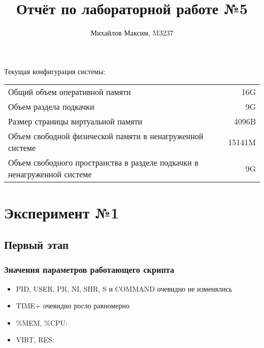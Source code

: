 \documentclass[10pt, a4paper]{article}
\begin{document}
\title{Отчёт по лабораторной работе №5}
\author{Михайлов Максим, M3237}

\maketitle

Текущая конфигурация системы:

\begin{tabular}{|l|r|}
    \hline
    Общий объем оперативной памяти                                           & 16G    \\
    Объем раздела подкачки                                                   & 9G     \\
    Размер страницы виртуальной памяти                                       & 4096B  \\
    Объем свободной физической памяти в ненагруженной системе                & 15141M \\
    Объем свободного пространства в разделе подкачки в ненагруженной системе & 9G     \\
    \hline
\end{tabular}

\section*{Эксперимент №1}

\subsection*{Первый этап}

\subsubsection*{Значения параметров работающего скрипта}

\begin{itemize}
    \item PID, USER, PR, NI, SHR, S и COMMAND очевидно не изменялись
    \item TIME+ очевидно росло равномерно
    \item \%MEM, \%CPU:
\end{itemize}



\begin{itemize}
    \item VIRT, RES:
\end{itemize}
\end{document}
